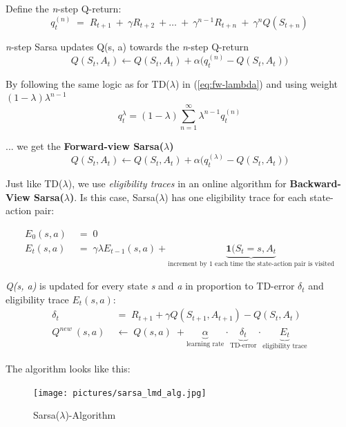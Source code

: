 \documentclass[10pt]{article}
\begin{document}
Define the \textit{n}-step Q-return:
\begin{equation}
q_{t}^{(n)} \; = \; R_{t+1} \: + \: \gamma R_{t+2} \: + \ldots \: + \: \gamma^{n-1} R_{t+n} \: + \: \gamma^{n} Q(S_{t+n}) 
\end{equation}

\textit{n}-step Sarsa updates Q(s, a) towards the \textit{n}-step Q-return
\begin{equation}
Q(S_{t}, A_{t}) \leftarrow Q(S_{t}, A_{t}) + \alpha \bigl( q_{t}^{(n)} - Q(S_{t}, A_{t}) \bigr)
\end{equation}

By following the same logic as for TD($\lambda$) in (\ref{eq:fw-lambda}) and using weight $(1-\lambda) \lambda^{n-1}$
\begin{equation}
q^{\lambda}_{t} = (1-\lambda) \sum_{n=1}^{\infty} \lambda^{n-1}q^{(n)}_{t}
\end{equation}

... we get the \textbf{Forward-view Sarsa($\lambda$)}
\begin{equation}
Q(S_{t}, A_{t}) \leftarrow Q(S_{t}, A_{t}) + \alpha \bigl( q_{t}^{(\lambda)} - Q(S_{t}, A_{t}) \bigr)
\end{equation}

Just like TD($\lambda$), we use \textit{eligibility traces} in an online algorithm for \textbf{Backward-View Sarsa($\lambda$)}. Is this case, Sarsa($\lambda$) has one eligibility trace for each state-action pair:

\begin{align}
E_{0} (s, a) \; &= \; 0 \\
E_{t} (s, a) \; &= \; \gamma \lambda E_{t-1}(s, a) + \underbrace{\mathbf{1}(S_{t} = s, A_{t}}_{\text{increment by 1 each time the state-action pair is visited}}
\end{align}

\textit{Q(s, a)} is updated for every state \textit{s} and \textit{a} in proportion to TD-error $\delta_{t}$ and eligibility trace $E_{t}(s, a)$:
\begin{align}
\delta_{t} \; &= \; R_{t+1} + \gamma Q(S_{t+1}, A_{t+1}) - Q(S_{t}, A_{t}) \\
Q^{new}\:(s, a) \; &\leftarrow \; Q(s, a) \; + \underbrace{\alpha}_{\text{learning rate}} \cdot \underbrace{\delta_{t}}_{\text{TD-error}} \cdot \underbrace{E_{t}}_{\text{eligibility trace}}
\end{align}

The algorithm looks like this:

\begin{figure}[h!]
\begin{center}
\texttt{[image: pictures/sarsa\_lmd\_alg.jpg]}
\caption{Sarsa($\lambda$)-Algorithm}
\end{center}
\end{figure}
\end{document}
